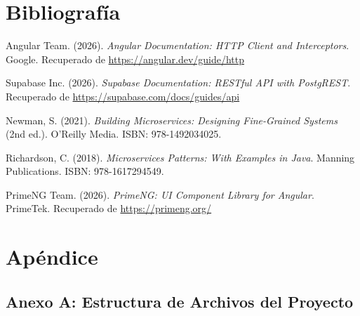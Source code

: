 \documentclass[12pt,a4paper]{article}
\begin{document}
\newpage
\section{Bibliografía}

\begin{enumerate}[label={[\arabic*]}]
    \item Angular Team. (2026). \textit{Angular Documentation: HTTP Client and Interceptors}. Google. Recuperado de \url{https://angular.dev/guide/http}

    \item Supabase Inc. (2026). \textit{Supabase Documentation: RESTful API with PostgREST}. Recuperado de \url{https://supabase.com/docs/guides/api}

    \item Newman, S. (2021). \textit{Building Microservices: Designing Fine-Grained Systems} (2nd ed.). O'Reilly Media. ISBN: 978-1492034025.

    \item Richardson, C. (2018). \textit{Microservices Patterns: With Examples in Java}. Manning Publications. ISBN: 978-1617294549.

    \item PrimeNG Team. (2026). \textit{PrimeNG: UI Component Library for Angular}. PrimeTek. Recuperado de \url{https://primeng.org/}
\end{enumerate}

\newpage
\section{Apéndice}

\subsection{Anexo A: Estructura de Archivos del Proyecto}
\end{document}
